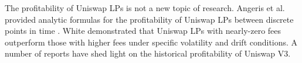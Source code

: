     The profitability of Uniswap LPs is not a new topic of research. 
    Angeris et al. provided analytic formulas for the profitability of Uniswap LPs between discrete points in time \cite{angeris2019analysis}. %
    White demonstrated that Uniswap LPs with nearly-zero fees outperform those with higher fees under specific volatility and drift conditions. %
    A number of reports have shed light on the historical profitability of Uniswap V3. %
    
